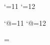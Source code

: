 

\catcode`\@=11
\def\gridb@x#1{%
 \setbox0=\ifgridp@c\vbox{\box#1}\else\killd@scenders#1\fi%
 \dimen2=\ht0 \advance\dimen2 by \dp0
 \dimen0=\baselineskip \vskip\baselineskip
 \ifgridp@c\line{}\nobreak\fi %
 \loop \ifdim\dimen0<\dimen2
   \advance\dimen0 by \baselineskip
    \line{}\nobreak \repeat
 \setbox0=\vbox to 0pt{\kern-\ht0\unvbox0}
 \unvbox0 \nobreak
}
\catcode`\@=12






\catcode`@=11
\def\makedigitsother{\m@kedigitsother}
\def\makedigitsletters{\m@kedigitsletters}
\catcode `@=12

\def\nbsp{ }    %
\def\zwsp{​}     %
\def\zwj{‍}      %

\newdimen\remblskip \remblskip=\baselineskip
\def\suckupline{\vskip -\baselineskip}          %
\def\suckuphalfline{\vskip -0.5\baselineskip}   %
\def\suckupqline{\vskip -0.25\baselineskip}     %
\def\skipline{\vskip\baselineskip}              %
\def\skiphalfline{\vskip 0.5\baselineskip}      %
\def\skipqline{\vskip 0.25\baselineskip}        %


